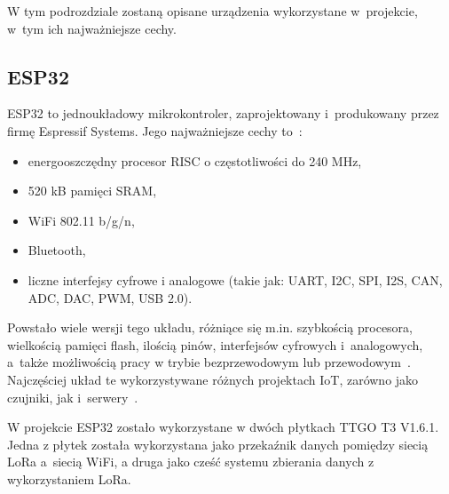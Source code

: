W tym podrozdziale zostaną opisane urządzenia wykorzystane w~projekcie, w~tym ich najważniejsze cechy.

\subsection{ESP32}
ESP32 to jednoukładowy mikrokontroler, zaprojektowany i~produkowany przez firmę Espressif Systems.
Jego najważniejsze cechy to~\cite{ESP32:datasheet}:
\begin{itemize}
    \item energooszczędny procesor RISC o częstotliwości do 240 MHz,
    \item 520 kB pamięci SRAM,
    \item WiFi 802.11 b/g/n,
    \item Bluetooth,
    \item liczne interfejsy cyfrowe i analogowe (takie jak: UART, I2C, SPI, I2S, CAN, ADC, DAC, PWM, USB 2.0).
\end{itemize}

Powstało wiele wersji tego układu, różniące się m.in. szybkością procesora, wielkością pamięci flash, ilością pinów, interfejsów cyfrowych i~analogowych, a~także możliwością pracy w trybie bezprzewodowym lub przewodowym~\cite{ESP32:socs}.
Najczęściej układ te wykorzystywane różnych projektach IoT, zarówno jako czujniki, jak i~serwery~\cite{ESP32:datasheet}.


W projekcie ESP32 zostało wykorzystane w dwóch płytkach TTGO T3 V1.6.1.
Jedna z płytek została wykorzystana jako przekaźnik danych pomiędzy siecią LoRa a~siecią WiFi, a druga jako cześć systemu zbierania danych z wykorzystaniem LoRa.


